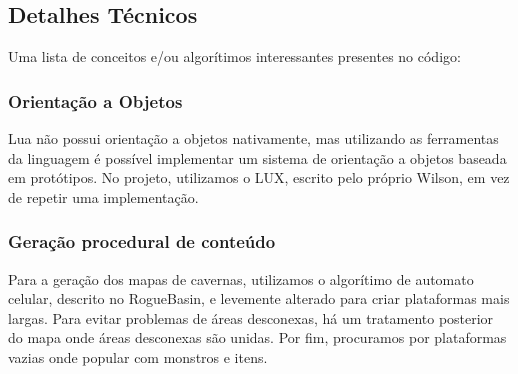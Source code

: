   \subsection{Detalhes Técnicos}
    Uma lista de conceitos e/ou algorítimos interessantes presentes no código:
    
    \subsubsection{Orientação a Objetos}
      Lua não possui orientação a objetos nativamente, mas utilizando as ferramentas da linguagem é possível
      implementar um sistema de orientação a objetos baseada em protótipos.
      No projeto, utilizamos o LUX\footnotemark, escrito pelo próprio Wilson, em vez de repetir uma implementação.
      
    
    \subsubsection{Geração procedural de conteúdo}
      Para a geração dos mapas de cavernas, utilizamos o algorítimo de automato celular, descrito no RogueBasin,
      \cite{website:roguebasin-cellularautomata} e levemente alterado para criar plataformas mais largas. Para
      evitar problemas de áreas desconexas, há um tratamento posterior do mapa onde áreas desconexas são unidas.
      Por fim, procuramos por plataformas vazias onde popular com monstros e itens.